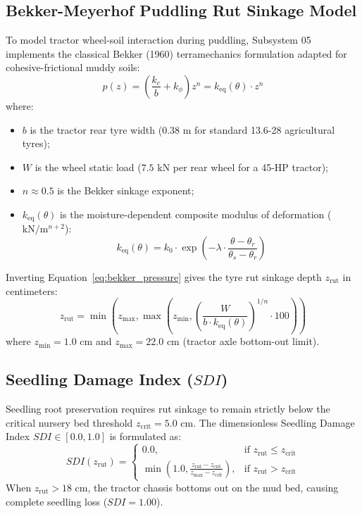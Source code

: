 \documentclass[11pt,a4paper]{article}
\theoremstyle{definition}
\theoremstyle{remark}
\begin{document}
\subsection{Bekker-Meyerhof Puddling Rut Sinkage Model}
To model tractor wheel-soil interaction during puddling, Subsystem 05 implements the classical Bekker (1960) terramechanics formulation adapted for cohesive-frictional muddy soils:
\begin{equation}
    p(z) = \left( \frac{k_c}{b} + k_\phi \right) z^n = k_{\text{eq}}(\theta) \cdot z^n
    \label{eq:bekker_pressure}
\end{equation}
\noindent where:
\begin{itemize}
    \item $b$ is the tractor rear tyre width ($0.38\text{ m}$ for standard 13.6-28 agricultural tyres);
    \item $W$ is the wheel static load ($7.5\text{ kN}$ per rear wheel for a 45-HP tractor);
    \item $n \approx 0.5$ is the Bekker sinkage exponent;
    \item $k_{\text{eq}}(\theta)$ is the moisture-dependent composite modulus of deformation ($\text{kN}/\text{m}^{n+2}$):
    \begin{equation}
        k_{\text{eq}}(\theta) = k_0 \cdot \exp\left( -\lambda \cdot \frac{\theta - \theta_r}{\theta_s - \theta_r} \right)
    \end{equation}
\end{itemize}

Inverting Equation~\eqref{eq:bekker_pressure} gives the tyre rut sinkage depth $z_{\text{rut}}$ in centimeters:
\begin{equation}
    z_{\text{rut}} = \min\left( z_{\text{max}}, \max\left( z_{\text{min}}, \left( \frac{W}{b \cdot k_{\text{eq}}(\theta)} \right)^{1/n} \cdot 100 \right) \right)
    \label{eq:rut_solution}
\end{equation}
where $z_{\text{min}} = 1.0\text{ cm}$ and $z_{\text{max}} = 22.0\text{ cm}$ (tractor axle bottom-out limit).

\subsection{Seedling Damage Index ($SDI$)}
Seedling root preservation requires rut sinkage to remain strictly below the critical nursery bed threshold $z_{\text{crit}} = 5.0\text{ cm}$. The dimensionless Seedling Damage Index $SDI \in [0.0, 1.0]$ is formulated as:
\begin{equation}
    SDI(z_{\text{rut}}) = \begin{cases}
        0.0, & \text{if } z_{\text{rut}} \le z_{\text{crit}} \\
        \min\left( 1.0, \frac{z_{\text{rut}} - z_{\text{crit}}}{z_{\text{max}} - z_{\text{crit}}} \right), & \text{if } z_{\text{rut}} > z_{\text{crit}}
    \end{cases}
    \label{eq:sdi_formulation}
\end{equation}
When $z_{\text{rut}} > 18\text{ cm}$, the tractor chassis bottoms out on the mud bed, causing complete seedling loss ($SDI = 1.00$).
\end{document}
